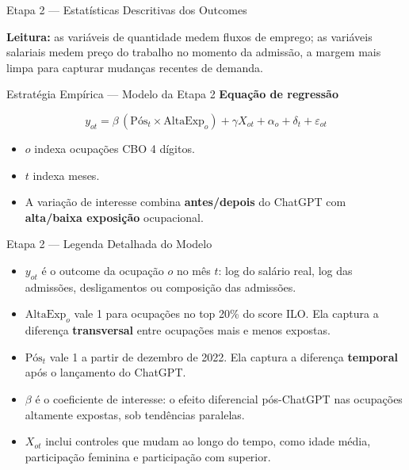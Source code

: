 \documentclass[
  ignorenonframetext,
  aspectratio=169,
]{beamer}
\providecommand{\tightlist}{%
  \setlength{\itemsep}{0pt}\setlength{\parskip}{0pt}}
\begin{document}
\begin{frame}{Etapa 2 --- Estatísticas Descritivas dos Outcomes}
\label{etapa-2-estatuxedsticas-descritivas-dos-outcomes}
\begin{center}
\resizebox{0.96\textwidth}{!}{}
\end{center}

\vspace{0.15cm}

\textbf{Leitura:} as variáveis de quantidade medem fluxos de emprego; as
variáveis salariais medem preço do trabalho no momento da admissão, a
margem mais limpa para capturar mudanças recentes de demanda.
\end{frame}

\begin{frame}{Estratégia Empírica --- Modelo da Etapa 2}
\label{estratuxe9gia-empuxedrica-modelo-da-etapa-2}
\textbf{Equação de regressão}

\[
y_{ot} =
\beta\,(\text{Pós}_t \times \text{AltaExp}_o)
+ \gamma X_{ot}
+ \alpha_o
+ \delta_t
+ \varepsilon_{ot}
\]

\vspace{0.3cm}

\begin{itemize}
\tightlist
\item
  \(o\) indexa ocupações CBO 4 dígitos.
\item
  \(t\) indexa meses.
\item
  A variação de interesse combina \textbf{antes/depois} do ChatGPT com
  \textbf{alta/baixa exposição} ocupacional.
\end{itemize}
\end{frame}

\begin{frame}{Etapa 2 --- Legenda Detalhada do Modelo}
\label{etapa-2-legenda-detalhada-do-modelo}
\begin{itemize}
\tightlist
\item
  \(y_{ot}\) é o outcome da ocupação \(o\) no mês \(t\): log do salário
  real, log das admissões, desligamentos ou composição das admissões.
\item
  \(\text{AltaExp}_o\) vale 1 para ocupações no top 20\% do score ILO.
  Ela captura a diferença \textbf{transversal} entre ocupações mais e
  menos expostas.
\item
  \(\text{Pós}_t\) vale 1 a partir de dezembro de 2022. Ela captura a
  diferença \textbf{temporal} após o lançamento do ChatGPT.
\item
  \(\beta\) é o coeficiente de interesse: o efeito diferencial
  pós-ChatGPT nas ocupações altamente expostas, sob tendências
  paralelas.
\item
  \(X_{ot}\) inclui controles que mudam ao longo do tempo, como idade
  média, participação feminina e participação com superior.
\end{itemize}
\end{frame}
\end{document}
